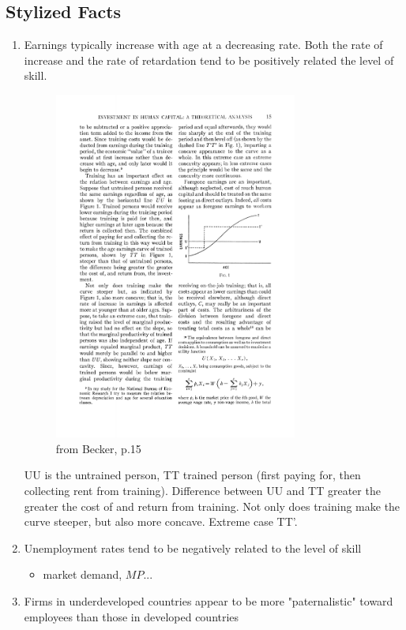 \documentclass[12pt,a4paper]{article}
\begin{document}
  \subsection{Stylized Facts} %
  \begin{enumerate}
    \item Earnings typically increase with age at a decreasing rate. Both the rate of increase and the rate of retardation tend to be positively related the level of skill.\\
      \begin{figure}[ht]
        \centering
        \includegraphics[width=8cm]{fig1.pdf}
        \caption{from Becker, p.15}
        \label{fig1}
      \end{figure}
      UU is the untrained person, TT trained person (first paying for, then collecting rent from training). Difference between UU and TT greater the greater the cost of and return from training. Not only does training make the curve steeper, but also more concave. Extreme case TT'.
    \item Unemployment rates tend to be negatively related to the level of skill
      \begin{itemize}
        \item market demand, $MP$...
      \end{itemize}
    \item Firms in underdeveloped countries appear to be more
      "paternalistic" toward employees than those in developed countries
      \begin{itemize}

\end{itemize}
\end{enumerate}
\end{document}
